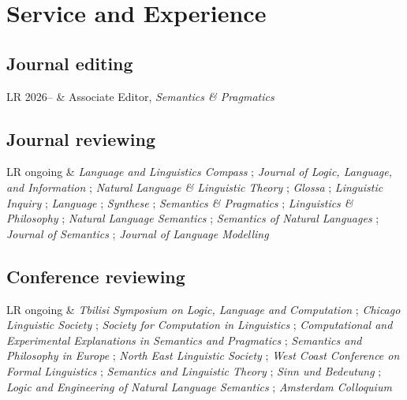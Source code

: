 \documentclass[12pt]{article}
\begin{document}
\medskip

\section*{Service and Experience}

\subsection*{Journal editing}

\begin{longtable}{LR}
  2026-- & Associate Editor, \textit{Semantics \& Pragmatics}\\
\end{longtable}

\subsection*{Journal reviewing}

\begin{longtable}{LR}
  ongoing &
    \textit{Language and Linguistics Compass}%
    ;
    \textit{Journal of Logic, Language, and Information}%
    ;
    \textit{Natural Language \& Linguistic Theory}%
    ;
    \textit{Glossa}%
    ;
    \textit{Linguistic Inquiry}%
    ;
    \textit{Language}%
    ;
    \textit{Synthese}%
    ;
    \textit{Semantics \& Pragmatics}%
    ;
    \textit{Linguistics \& Philosophy}%
    ;
    \textit{Natural Language Semantics}%
    ;
    \textit{Semantics of Natural Languages}%
    ;
    \textit{Journal of Semantics}%
    ;
    \textit{Journal of Language Modelling}%
\end{longtable}

\subsection*{Conference reviewing}

\begin{longtable}{LR}
  ongoing &
    \textit{Tbilisi Symposium on Logic, Language and Computation}%
    ;
    \textit{Chicago Linguistic Society}%
    ;
    \textit{Society for Computation in Linguistics}%
    ;
    \textit{Computational and Experimental Explanations in Semantics and Pragmatics}%
    ;
    \textit{Semantics and Philosophy in Europe}%
    ;
    \textit{North East Linguistic Society}%
    ;
    \textit{West Coast Conference on Formal Linguistics}%
    ;
    \textit{Semantics and Linguistic Theory}%
    ;
    \textit{Sinn und Bedeutung}%
    ;
    \textit{Logic and Engineering of Natural Language Semantics}%
    ;
    \textit{Amsterdam Colloquium}%
\end{longtable}
\end{document}
